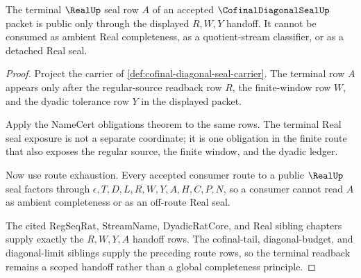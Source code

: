 \begin{theorem}
\label{thm:cofinal-diagonal-seal-terminal-readback-handoff}
The terminal $\RealUp$ seal row $A$ of an accepted $\CofinalDiagonalSealUp$ packet is public only through the displayed $R,W,Y$ handoff. It cannot be consumed as ambient Real completeness, as a quotient-stream classifier, or as a detached Real seal.
\end{theorem}
\begin{proof}
Project the carrier of \autoref{def:cofinal-diagonal-seal-carrier}. The terminal row $A$ appears only after the regular-source readback row $R$, the finite-window row $W$, and the dyadic tolerance row $Y$ in the displayed packet.

Apply the NameCert obligations theorem to the same rows. The terminal Real seal exposure is not a separate coordinate; it is one obligation in the finite route that also exposes the regular source, the finite window, and the dyadic ledger.

Now use route exhaustion. Every accepted consumer route to a public $\RealUp$ seal factors through $\epsilon,T,D,L,R,W,Y,A,H,C,P,N$, so a consumer cannot read $A$ as ambient completeness or as an off-route Real seal.

The cited RegSeqRat, StreamName, DyadicRatCore, and Real sibling chapters supply exactly the $R,W,Y,A$ handoff rows. The cofinal-tail, diagonal-budget, and diagonal-limit siblings supply the preceding route rows, so the terminal readback remains a scoped handoff rather than a global completeness principle.
\end{proof}

